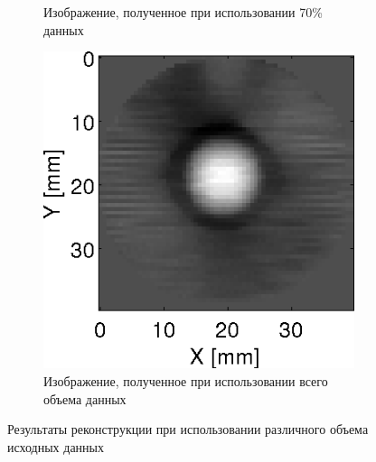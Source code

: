\documentclass[14pt]{matmex-diploma}
\begin{document}
\begin{figure}[h]
\begin{subfigure}{.32\textwidth}
    \caption{Изображение, полученное при использовании 70\% данных}
    \label{fig:percents_70}
\end{subfigure}
\begin{subfigure}{.32\textwidth}
    \centering
    \includegraphics[width=1\linewidth]{pics/ref_kwave_99.9p.png}
    \caption{Изображение, полученное при использовании всего объема данных}
    \label{fig:percents_100}
\end{subfigure}

    \caption{Результаты реконструкции при использовании различного объема исходных данных}
    \label{fig:reconstruction_exp1}
\end{figure}
\end{document}
